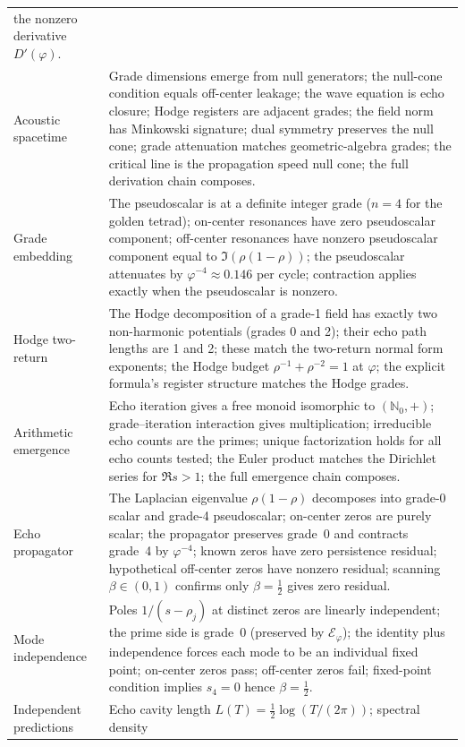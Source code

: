\documentclass[11pt,a4paper]{article}
\theoremstyle{plain}
\theoremstyle{definition}
\theoremstyle{remark}
\numberwithin{equation}{section}
\newcommand{\Nat}{\mathbb{N}}
\newcommand{\vp}{\varphi}
\begin{document}
\begin{longtable}{>{\raggedright\arraybackslash}p{3.1cm}>{\raggedright\arraybackslash}p{9.1cm}}
the nonzero derivative \(D'(\vp)\). \\
Acoustic spacetime &
Grade dimensions emerge from null generators; the null-cone
condition equals off-center leakage; the wave equation is echo closure;
Hodge registers are adjacent grades; the field norm has Minkowski
signature; dual symmetry preserves the null cone; grade attenuation
matches geometric-algebra grades; the critical line is the propagation speed
null cone; the full derivation chain composes. \\
Grade embedding &
The pseudoscalar is at a definite integer grade
(\(n=4\) for the golden tetrad);
on-center resonances have zero pseudoscalar component; off-center
resonances have nonzero pseudoscalar component equal to
\(\Im(\rho(1-\rho))\); the pseudoscalar attenuates by
\(\vp^{-4}\approx0.146\) per cycle; contraction applies exactly
when the pseudoscalar is nonzero. \\
Hodge two-return &
The Hodge decomposition of a grade-1 field has exactly two
non-harmonic potentials (grades 0 and 2); their echo path lengths
are 1 and 2; these match the two-return normal form exponents;
the Hodge budget \(\rho^{-1}+\rho^{-2}=1\) at \(\vp\); the
explicit formula's register structure matches the Hodge grades. \\
Arithmetic emergence &
Echo iteration gives a free monoid isomorphic to \((\Nat_0,+)\);
grade--iteration interaction gives multiplication;
irreducible echo counts are the primes;
unique factorization holds for all echo counts tested;
the Euler product matches the Dirichlet series for \(\Re s>1\);
the full emergence chain composes. \\
Echo propagator &
The Laplacian eigenvalue \(\rho(1-\rho)\) decomposes into grade-0
scalar and grade-4 pseudoscalar; on-center zeros are purely scalar;
the propagator preserves grade~0 and contracts grade~4 by
\(\vp^{-4}\); known zeros have zero persistence residual; hypothetical
off-center zeros have nonzero residual; scanning \(\beta\in(0,1)\)
confirms only \(\beta=\tfrac12\) gives zero residual. \\
Mode independence &
Poles \(1/(s-\rho_j)\) at distinct zeros are linearly independent;
the prime side is grade~0 (preserved by \(\mathcal{E}_\vp\));
the identity plus independence forces each mode to be an individual
fixed point; on-center zeros pass; off-center zeros fail;
fixed-point condition implies \(s_4=0\) hence \(\beta=\tfrac12\). \\
Independent predictions &
Echo cavity length \(L(T)=\tfrac12\log(T/(2\pi))\); spectral density

\end{longtable}
\end{document}
